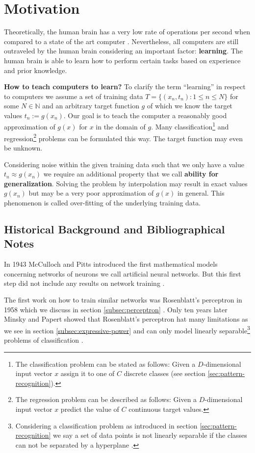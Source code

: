 \section{Motivation}
\label{sec:motivation}

Theoretically, the human brain has a very low rate of operations per second when compared to a state of the art computer \cite[p.~28]{Haykin:2005}. Nevertheless, all computers are still outraveled by the human brain considering an important factor: \textbf{learning}. The human brain is able to learn how to perform certain tasks based on experience and prior knowledge.

\textbf{How to teach computers to learn?} To clarify the term ``learning'' in respect to computers we assume a set of training data $T = \{(x_n, t_n) : 1 \leq n \leq N\}$ for some $N \in \mathbb{N}$ and an arbitrary target function $g$ of which we know the target values $t_n := g(x_n)$. Our goal is to teach the computer a reasonably good approximation of $g(x)$ for $x$ in the domain of $g$. Many classification\footnote{The classification problem can be stated as follows: Given a $D$-dimensional input vector $x$ assign it to one of $C$ discrete classes (see section \ref{sec:pattern-recognition}).} and regression\footnote{The regression problem can be described as follows: Given a $D$-dimensional input vector $x$ predict the value of $C$ continuous target values.} problems can be formulated this way. The target function may even be unknown.

Considering noise within the given training data such that we only have a value $t_n \approx g(x_n)$ we require an additional property that we call \textbf{ability for generalization}. Solving the problem by interpolation may result in exact values $g(x_n)$ but may be a very poor approximation of $g(x)$ in general. This phenomenon is called over-fitting of the underlying training data.

\subsection{Historical Background and Bibliographical Notes}

In 1943 McCulloch and Pitts introduced the first mathematical models concerning networks of neurons we call artificial neural networks. But this first step did not include any results on network training \cite[p.~333-335]{DudaHartStork:2001}.

The first work on how to train similar networks was Rosenblatt's perceptron in 1958 which we discuss in section \ref{subsec:perceptron} \cite{Rosenblatt:1958}. Only ten years later Minsky and Papert showed that Rosenblatt's perceptron hat many limitations as we see in section \ref{subsec:expressive-power} and can only model linearly separable\footnote{Considering a classification problem as introduced in section \ref{sec:pattern-recognition} we say a set of data points is not linearly separable if the classes can not be separated by a hyperplane \cite[p.~179]{Bishop:2006}.} problems of classification \cite[p.~333-335]{DudaHartStork:2001}.


